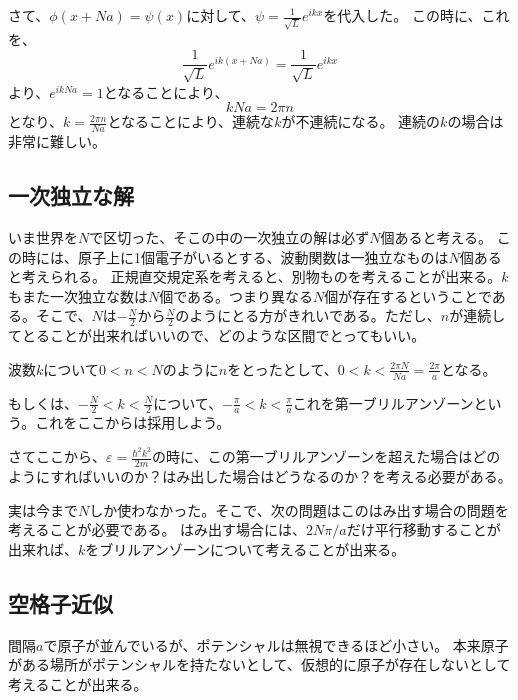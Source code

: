 \documentclass[titlepage]{ltjsarticle}
\begin{document}
さて、\(\phi(x+Na)=\psi(x)\)に対して、\(\psi=\frac{1}{\sqrt{L}}e^{ikx}\)を代入した。
この時に、これを、
\begin{equation}
  \frac{1}{\sqrt{L}} e^{ik(x+Na)} = \frac{1}{\sqrt{L}} e^{ikx}
\end{equation}
より、\(e^{ikNa}=1\)となることにより、
\begin{equation}
  kNa = 2\pi n 
\end{equation}
となり、\(k=\frac{2\pi n}{Na }\)となることにより、連続な\(k\)が不連続になる。
連続の\(k\)の場合は非常に難しい。


\subsection{一次独立な解}
いま世界を\(N\)で区切った、そこの中の一次独立の解は必ず\(N\)個あると考える。
この時には、原子上に1個電子がいるとする、波動関数は一独立なものは\(N\)個あると考えられる。
正規直交規定系を考えると、別物ものを考えることが出来る。\(k\)もまた一次独立な数は\(N\)個である。つまり異なる\(N\)個が存在するということである。そこで、\(N\)は\(-\frac{N }{2}\)から\(\frac{N}{2}\)のようにとる方がきれいである。ただし、\(n\)が連続してとることが出来ればいいので、どのような区間でとってもいい。

波数\(k\)について\(0<n<N \)のように\(n\)をとったとして、\(0<k<\frac{2\pi N}{Na}=\frac{2 \pi}{a}\)となる。

もしくは、\(-\frac{N }{2}<k < \frac{N}{2}\)について、\(-\frac{\pi}{a}< k < \frac{\pi}{a}\)これを第一ブリルアンゾーンという。これをここからは採用しよう。

さてここから、\(\varepsilon=\frac{\hbar^2 k^2}{2m}\)の時に、この第一ブリルアンゾーンを超えた場合はどのようにすればいいのか？はみ出した場合はどうなるのか？を考える必要がある。

実は今まで\(N\)しか使わなかった。そこで、次の問題はこのはみ出す場合の問題を考えることが必要である。
はみ出す場合には、\(2N\pi/a\)だけ平行移動することが出来れば、\(k\)をブリルアンゾーンについて考えることが出来る。

\subsection{空格子近似}
間隔\(a\)で原子が並んでいるが、ポテンシャルは無視できるほど小さい。
本来原子がある場所がポテンシャルを持たないとして、仮想的に原子が存在しないとして考えることが出来る。
\end{document}
